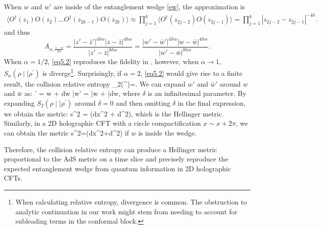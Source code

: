 \documentclass[12pt]{article}
\def\[#1\]{\begin{align}#1\end{align}}
\begin{document}
 When $w$ and $w'$ are inside of the entanglement wedge \eqref{ew}, the approximation is
 \begin{equation}
     \begin{split}
 \langle O  ^\dagger(z_1)O  (z_2)... O  ^\dagger(z_{2k-1})O(z_{2k})\rangle
\approx   \prod_{j=1}^k \langle  O^\dagger(z_{2j-2})O(z_{2j-1})\rangle =  \prod_{j=1}^k |z_{2j-2}-z_{2j-1}|^{-4h}.        
     \end{split}
 \end{equation}
and thus
 \begin{equation}
A_{\alpha,\frac{1-\alpha}{2\alpha}}=
\frac{|z'-\bar z'|^{4h\alpha}|z-\bar z|^{4h\alpha}}{|z'-\bar z|^{8h\alpha} } 
=
\frac{|w'-\bar w'|^{4h\alpha}|w-\bar w|^{4h\alpha}}{|w'-\bar w|^{8h\alpha} } .\label{eq5.2}
\end{equation}
When $\alpha=1/2$, \eqref{eq5.2} reproduces the fidelity in \cite{Suzuki:2019xdq}, however, when $\alpha\to1$, $S_{\alpha}(\rho\mid\mid\rho^{\prime})$ is diverge\footnote{When calculating relative entropy, divergence is common. The obstruction to analytic continuation in our work might stem from needing to account for subleading terms in the conformal block.}. 
Surprisingly, if $\alpha=2$, \eqref{eq5.2} would give rise to a finite result, the collision relative entropy \cite{Lashkari:2014yva}
\[
S_{2}(\rho\mid\mid\rho^{\prime})=\ln {}.\label{eq5.3}
\] 
We can expand \( w' \) and \( \bar{w}' \) around \( w \) and \( \bar{w} \) as:
\[
w' = w + \delta dw \quad \bar{w}' = \bar{w} + \delta \bar{d}w,
\]
where \( \delta \) is an infinitesimal parameter. By expanding \( S_{2}(\rho\mid\mid\rho^{\prime}) \) around \( \delta = 0 \) and then omitting \( \delta \) in the final expression, we obtain the metric:
\[
ds^2 = (dx^2 + d\tau^2),
\] 
{which is the Hellinger metric\cite{Kusuki:2019hcg}.} Similarly, in a 2D holographic CFT with a circle compactification $x\sim x+2\pi$, we can obtain the metric
\[
ds^2=(dx^2+d\tau^2)
\]
if $w$ is inside the wedge.

Therefore, the collision relative entropy can produce a Hellinger metric proportional to the AdS metric on a time slice and precisely reproduce the expected entanglement wedge from quantum information in 2D holographic CFTs. 
\end{document}
